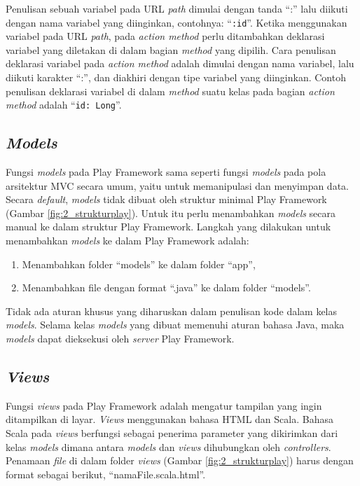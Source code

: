 Penulisan sebuah variabel pada URL \textit{path} dimulai dengan tanda ``:'' lalu diikuti dengan nama variabel yang diinginkan, contohnya: ``\texttt{:id}''. Ketika menggunakan variabel pada URL \textit{path}, pada \textit{action method} perlu ditambahkan deklarasi variabel yang diletakan di dalam bagian \textit{method} yang dipilih. Cara penulisan deklarasi variabel pada \textit{action method} adalah dimulai dengan nama variabel, lalu diikuti karakter ``:'', dan diakhiri dengan tipe variabel yang diinginkan. Contoh penulisan deklarasi variabel di dalam \textit{method} suatu kelas pada bagian \textit{action method} adalah ``\texttt{id: Long}''. 

\subsection{\textit{Models}}
\label{sec:models}
Fungsi \textit{models} pada Play Framework sama seperti fungsi \textit{models} pada pola arsitektur MVC secara umum, yaitu untuk memanipulasi dan menyimpan data. Secara \textit{default}, \textit{models} tidak dibuat oleh struktur minimal Play Framework (Gambar \ref{fig:2_strukturplay}). Untuk itu perlu menambahkan \textit{models} secara manual ke dalam struktur Play Framework. Langkah yang dilakukan untuk menambahkan \textit{models} ke dalam Play Framework adalah:
\begin{enumerate}
	\item Menambahkan folder ``models'' ke dalam folder ``app'',
	\item Menambahkan file dengan format ``.java'' ke dalam folder ``models''.
\end{enumerate}

Tidak ada aturan khusus yang diharuskan dalam penulisan kode dalam kelas \textit{models}. Selama kelas \textit{models} yang dibuat memenuhi aturan bahasa Java, maka \textit{models} dapat dieksekusi oleh \textit{server} Play Framework.

\subsection{\textit{Views}}
\label{sec:views}
Fungsi \textit{views} pada Play Framework adalah mengatur tampilan yang ingin ditampilkan di layar. \textit{Views} menggunakan bahasa HTML dan Scala. Bahasa Scala pada \textit{views} berfungsi sebagai penerima parameter yang dikirimkan dari kelas \textit{models} dimana antara \textit{models} dan \textit{views} dihubungkan oleh \textit{controllers}. Penamaan \textit{file} di dalam folder \textit{views} (Gambar \ref{fig:2_strukturplay}) harus dengan format sebagai berikut, ``namaFile.scala.html''.


